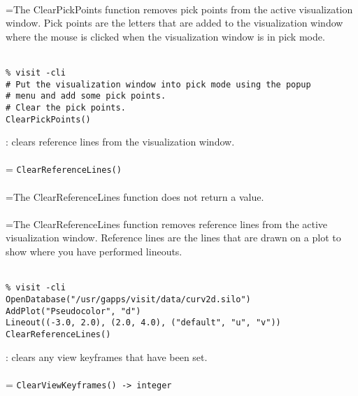 \documentclass[10pt,a4paper]{report}
\begin{document}
 \\ 
\hangindent=\parindent The ClearPickPoints function removes pick points from the active visualization window. Pick points are the letters that are added to the visualization window where the mouse is clicked when the visualization window is in pick mode. \\[-3mm] 

\\[-6mm]
\begin{verbatim}% visit -cli
# Put the visualization window into pick mode using the popup 
# menu and add some pick points.
# Clear the pick points.
ClearPickPoints()
\end{verbatim}
\newpage


{}
: clears reference lines from the visualization window.\\[-3mm]

 \\ 
\hangindent=\parindent 
\verb!ClearReferenceLines()!\\ [-3mm]

 \\ 
\hangindent=\parindent The ClearReferenceLines function does not return a value. \\[-3mm] 

 \\ 
\hangindent=\parindent The ClearReferenceLines function removes reference lines from the active visualization window. Reference lines are the lines that are drawn on a plot to show where you have performed lineouts. \\[-3mm] 

\\[-6mm]
\begin{verbatim}% visit -cli
OpenDatabase("/usr/gapps/visit/data/curv2d.silo")
AddPlot("Pseudocolor", "d")
Lineout((-3.0, 2.0), (2.0, 4.0), ("default", "u", "v"))
ClearReferenceLines()
\end{verbatim}
\newpage


{}
: clears any view keyframes that have been set.\\[-3mm]

 \\ 
\hangindent=\parindent 
\verb!ClearViewKeyframes() -> integer!\\ [-3mm]
\end{document}
